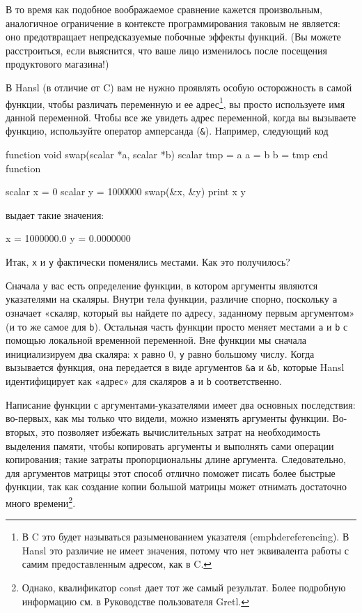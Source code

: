 В то время как подобное воображаемое сравнение кажется произвольным,
аналогичное ограничение в контексте программирования таковым не
является: оно предотвращает непредсказуемые побочные эффекты
функций. (Вы можете расстроиться, если выяснится, что ваше лицо
изменилось после посещения продуктового магазина!)

В Hansl (в отличие от C) вам не нужно проявлять особую осторожность в
самой функции, чтобы различать переменную и ее адрес\footnote{В C это
  будет называться разыменованием указателя (emph{dereferencing}). В
  Hansl это различие не имеет значения, потому что нет эквивалента
  работы с самим предоставленным адресом, как в C.}, вы просто
используете имя данной переменной. Чтобы все же увидеть адрес
переменной, когда вы вызываете функцию, используйте оператор
амперсанда (\verb|&|). Например, следующий код
\begin{code}
function void swap(scalar *a, scalar *b)
    scalar tmp = a
    a = b
    b = tmp
end function

scalar x = 0
scalar y = 1000000
swap(&x, &y)
print x y
\end{code}
выдает такие значения:
\begin{code}
              x =  1000000.0
              y =  0.0000000
\end{code}
Итак, \texttt{x} и \texttt{y} фактически поменялись местами. Как это
получилось?

Сначала у вас есть определение функции, в котором аргументы являются
указателями на скаляры. Внутри тела функции, различие спорно,
поскольку \verb|a| означает «скаляр, который вы найдете по адресу,
заданному первым аргументом» (и то же самое для \verb|b|). Остальная
часть функции просто меняет местами \verb|a| и \verb|b| с помощью
локальной временной переменной.  Вне функции мы сначала инициализируем
два скаляра: \texttt{x} равно 0, \texttt{y} равно большому
числу. Когда вызывается функция, она передается в виде аргументов
\verb|&a| и \verb|&b|, которые Hansl идентифицирует как «адрес» для
скаляров \texttt{a} и \texttt{b} соответственно.

Написание функции с аргументами-указателями имеет два основных
последствия: во-первых, как мы только что видели, можно изменять
аргументы функции. Во-вторых, это позволяет избежать вычислительных
затрат на необходимость выделения памяти, чтобы копировать аргументы и
выполнять сами операции копирования; такие затраты пропорциональны
длине аргумента. Следовательно, для аргументов матрицы этот способ
отлично поможет писать более быстрые функции, так как создание копии
большой матрицы может отнимать достаточно много
времени\footnote{Однако, квалификатор const дает тот же самый
  результат. Более подробную информацию см. в Руководстве пользователя
  Gretl.}.

